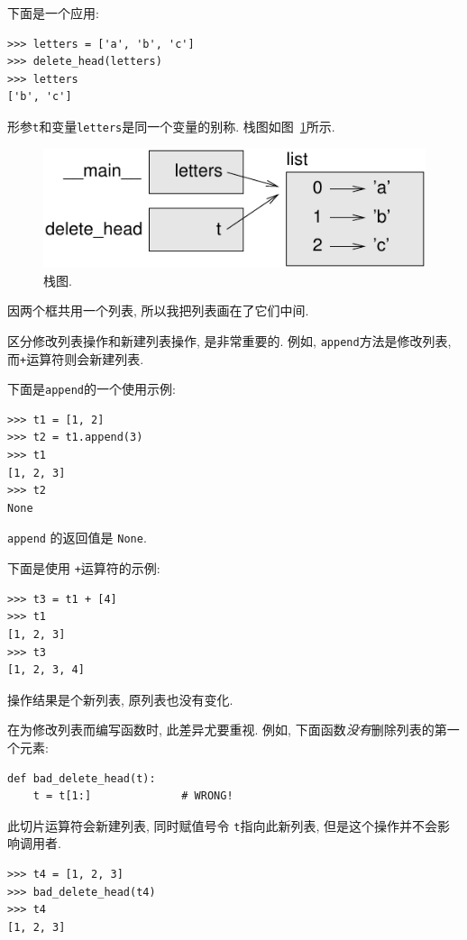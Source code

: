 \documentclass[10pt]{book}
\begin{document}
下面是一个应用:

\begin{verbatim}
>>> letters = ['a', 'b', 'c']
>>> delete_head(letters)
>>> letters
['b', 'c']
\end{verbatim}
%
形参{\tt t}和变量{\tt letters}是同一个变量的别称. 
栈图如图~\ref{fig.stack5}所示.

\begin{figure}
\centerline
{\includegraphics[scale=0.8]{figs/stack5.pdf}}
\caption{栈图.}
\label{fig.stack5}
\end{figure}

因两个框共用一个列表, 所以我把列表画在了它们中间. 

区分修改列表操作和新建列表操作, 是非常重要的. 
例如,  {\tt append}方法是修改列表, 而{\tt +}运算符则会新建列表.

下面是{\tt append}的一个使用示例:
%
\begin{verbatim}
>>> t1 = [1, 2]
>>> t2 = t1.append(3)
>>> t1
[1, 2, 3]
>>> t2
None
\end{verbatim}
%
{\tt append} 的返回值是 {\tt None}.

下面是使用 {\tt +}运算符的示例:
%
\begin{verbatim}
>>> t3 = t1 + [4]
>>> t1
[1, 2, 3]
>>> t3
[1, 2, 3, 4]
\end{verbatim}
%
操作结果是个新列表, 原列表也没有变化.

在为修改列表而编写函数时, 此差异尤要重视. 
例如, 下面函数{\em 没有}删除列表的第一个元素:
%
\begin{verbatim}
def bad_delete_head(t):
    t = t[1:]              # WRONG!
\end{verbatim}
%
此切片运算符会新建列表, 同时赋值号令 {\tt t}指向此新列表, 
但是这个操作并不会影响调用者.
%
\begin{verbatim}
>>> t4 = [1, 2, 3]
>>> bad_delete_head(t4)
>>> t4
[1, 2, 3]
\end{verbatim}
%
\end{document}
